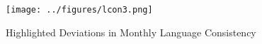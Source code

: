 \begin{landscape}
\begin{figure}[p!]
\begin{center}
\texttt{[image: ../figures/lcon3.png]}
\caption[Highlighted Deviations in Monthly Language Consistency]{Highlighted Deviations in Monthly Language Consistency\label{lcon3}}
\end{center}
\end{figure}
\end{landscape}


 
 
